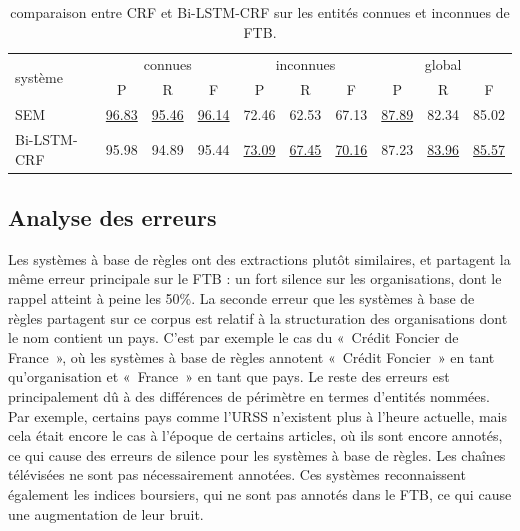 \documentclass[12pt,a4paper,times,twoside,openright]{report}
\begin{document}
\begin{table}[ht!]
\centering
\small
\begin{tabular}{|l|ccc|ccc|ccc|}
\hline
\multirow{2}{*}{système} & \multicolumn{3}{|c|}{connues} & \multicolumn{3}{|c|}{inconnues} & \multicolumn{3}{|c|}{global}\\
                         & P     & R     & F     & P     & R     & F     & P     & R     & F   \\
\hline
SEM                      & \underline{96.83} & \underline{95.46} & \underline{96.14} & 72.46             & 62.53             & 67.13             & \underline{87.89} & 82.34             & 85.02 \\
Bi-LSTM-CRF              & 95.98             & 94.89             & 95.44             & \underline{73.09} & \underline{67.45} & \underline{70.16} & 87.23             & \underline{83.96} & \underline{85.57} \\
\hline
\end{tabular}
\caption{comparaison entre CRF et Bi-LSTM-CRF sur les entités connues et inconnues de FTB.}
\label{tab:intro-CRF-vs-LSTM}
\end{table}


    
        \subsection{Analyse des erreurs}
        \label{subsec:ftb-comparo-errors}
Les systèmes à base de règles ont des extractions plutôt similaires, et partagent la même erreur principale sur le FTB : un fort silence sur les organisations, dont le rappel atteint à peine les 50\%. La seconde erreur que les systèmes à base de règles partagent sur ce corpus est relatif à la structuration des organisations dont le nom contient un pays. C'est par exemple le cas du «\ Crédit Foncier de France\ », où les systèmes à base de règles annotent «\ Crédit Foncier\ » en tant qu'organisation et «\ France\ » en tant que pays. Le reste des erreurs est principalement dû à des différences de périmètre en termes d'entités nommées. Par exemple, certains pays comme l'URSS n'existent plus à l'heure actuelle, mais cela était encore le cas à l'époque de certains articles, où ils sont encore annotés, ce qui cause des erreurs de silence pour les systèmes à base de règles. Les chaînes télévisées ne sont pas nécessairement annotées. Ces systèmes reconnaissent également les indices boursiers, qui ne sont pas annotés dans le FTB, ce qui cause une augmentation de leur bruit.
\end{document}
